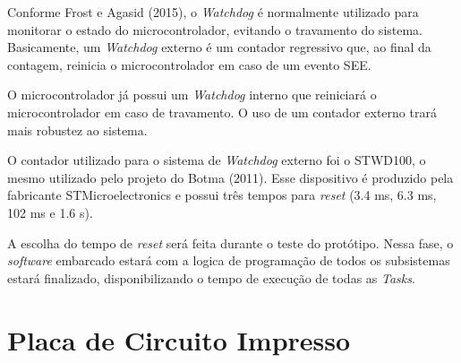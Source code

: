 Conforme  Frost e Agasid (2015), o \textit{Watchdog}  é normalmente utilizado para monitorar o estado do microcontrolador, evitando o travamento do sistema. Basicamente, um \textit{Watchdog} externo é um contador regressivo que, ao final da contagem, reinicia o microcontrolador em caso de um evento SEE. 

O microcontrolador já possui um \textit{Watchdog} interno que reiniciará o microcontrolador em caso de travamento. O uso de um contador externo trará mais robustez ao sistema.

O contador utilizado para o sistema de \textit{Watchdog} externo foi o STWD100, o mesmo utilizado pelo projeto do Botma (2011). Esse dispositivo é produzido pela fabricante STMicroelectronics e possui três tempos para \textit{reset} (3.4 ms, 6.3 ms, 102 ms e 1.6 s).  

A escolha do tempo de \textit{reset} será feita durante o teste do protótipo. Nessa fase, o \textit{software} embarcado estará com a logica de programação de todos os subsistemas estará finalizado, disponibilizando o tempo de execução de todas as \textit{Tasks}.

\newpage

\section{Placa de Circuito Impresso}

